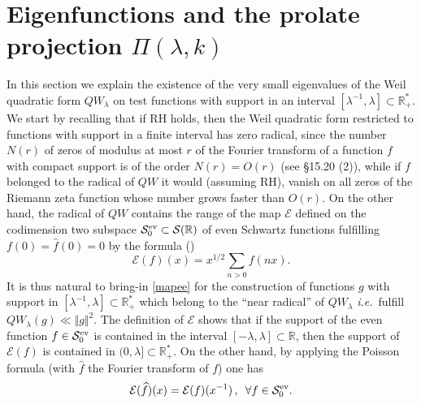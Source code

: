\documentclass[cupthm]{CUP-JNL-JMJ}
\def\R{{\mathbb R}}
\def\cE{{\mathcal E}}
\def\cS{{\mathcal S}}
\def\qqq{\,,\,~\forall}
\def\sr0{{\cS^{\rm ev}_0}}
\newcommand{\ie}{{\it i.e.\/}\ }
\numberwithin{equation}{section}
\theoremstyle{cupplain}
\theoremstyle{cupdefinition}
\theoremstyle{cupremark}
\theoremstyle{cupproof}
\begin{document}
\section{Eigenfunctions and the prolate projection $\Pi(\lambda,k)$}\label{riemweilexpl}
In this section we explain the existence of the very small eigenvalues of the Weil quadratic form $QW_\lambda$ on test functions with support in an interval $[\lambda^{-1},\lambda]\subset \R_+^*$. We start by recalling that if RH holds, then the Weil quadratic form restricted to functions with support in a  finite interval has zero  radical, since the number $N(r)$ of zeros  of modulus  at most $r$   of the Fourier transform of a function $f$ with compact support is of the order $
N(r) =O(r)$
 (see \cite{Rudin} \S 15.20 (2)), while if $f$  belonged to the radical of $QW$ it would (assuming RH), vanish on all zeros of the Riemann zeta function whose number grows faster  than $O(r)$. On the other hand,  the radical of  $QW$ contains the range of the  map $\cE$ defined  on the codimension two subspace $\sr0\subset\cS(\R)$ of even Schwartz functions fulfilling $f(0)=\widehat f(0)=0$ by the formula (\cite{Co-zeta})
\begin{equation}
\cE(f)(x)=x^{1/2}\sum_{n>0}f(nx).
\label{mapee}
\end{equation}
It is thus natural to bring-in \eqref{mapee} for the construction of functions $g$ with  support in $[\lambda^{-1},\lambda]\subset \R_+^*$ which belong to the ``near radical'' of $QW_\lambda$ \ie fulfill $QW_\lambda(g)\ll \Vert g\Vert^2$. The definition of $\cE$  shows that if the support of the even function $f\in \sr0$ is contained in the interval $[-\lambda,\lambda]\subset \R$, then the support of $\cE(f)$ is contained in $(0,\lambda]\subset \R_+^*$. On the other hand, by applying the  Poisson formula (with $\widehat f$ the Fourier transform of $f$) one  has
\begin{equation}
\cE(\widehat f)(x)=\cE(f)(x^{-1}) \qqq f\in \sr0.\label{poisson}
\end{equation}
\end{document}
